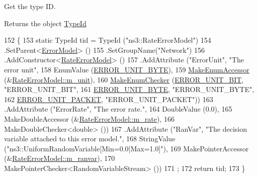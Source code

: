 Get the type ID. 

\begin{DoxyReturn}{Returns}
the object \hyperlink{classns3_1_1TypeId}{Type\+Id} 
\end{DoxyReturn}

\begin{DoxyCode}
152 \{ 
153   \textcolor{keyword}{static} TypeId tid = TypeId (\textcolor{stringliteral}{"ns3::RateErrorModel"})
154     .SetParent<\hyperlink{classns3_1_1ErrorModel_a89d58fc926bb907d546844d8e6437f30}{ErrorModel}> ()
155     .SetGroupName(\textcolor{stringliteral}{"Network"})
156     .AddConstructor<\hyperlink{classns3_1_1RateErrorModel_ac2f48cadd5c294ce6e41ce7d1fc2ae95}{RateErrorModel}> ()
157     .AddAttribute (\textcolor{stringliteral}{"ErrorUnit"}, \textcolor{stringliteral}{"The error unit"},
158                    EnumValue (\hyperlink{classns3_1_1RateErrorModel_a4da336ba2dfcb55e0b7d7a3e7e713c02a1ca371d9e108b4891a0fc4f567508db3}{ERROR\_UNIT\_BYTE}),
159                    \hyperlink{namespacens3_af5050739867ce63896dec011e332c8ec}{MakeEnumAccessor} (&\hyperlink{classns3_1_1RateErrorModel_a75b25e124364618bf15d66d0634c9cd4}{RateErrorModel::m\_unit}),
160                    \hyperlink{namespacens3_a48832781a2b521d3d0091e05ece30615}{MakeEnumChecker} (\hyperlink{classns3_1_1RateErrorModel_a4da336ba2dfcb55e0b7d7a3e7e713c02a21e90acaf501051edf3a2465a1486e9a}{ERROR\_UNIT\_BIT}, \textcolor{stringliteral}{"ERROR\_UNIT\_BIT"},
161                                     \hyperlink{classns3_1_1RateErrorModel_a4da336ba2dfcb55e0b7d7a3e7e713c02a1ca371d9e108b4891a0fc4f567508db3}{ERROR\_UNIT\_BYTE}, \textcolor{stringliteral}{"ERROR\_UNIT\_BYTE"},
162                                     \hyperlink{classns3_1_1RateErrorModel_a4da336ba2dfcb55e0b7d7a3e7e713c02aca366c7aebdc8be8b2ea287a7d3643a3}{ERROR\_UNIT\_PACKET}, \textcolor{stringliteral}{"ERROR\_UNIT\_PACKET"}))
163     .AddAttribute (\textcolor{stringliteral}{"ErrorRate"}, \textcolor{stringliteral}{"The error rate."},
164                    DoubleValue (0.0),
165                    MakeDoubleAccessor (&\hyperlink{classns3_1_1RateErrorModel_a024517a97a3487e851dbdfffb291cbd2}{RateErrorModel::m\_rate}),
166                    MakeDoubleChecker<double> ())
167     .AddAttribute (\textcolor{stringliteral}{"RanVar"}, \textcolor{stringliteral}{"The decision variable attached to this error model."},
168                    StringValue (\textcolor{stringliteral}{"ns3::UniformRandomVariable[Min=0.0|Max=1.0]"}),
169                    MakePointerAccessor (&\hyperlink{classns3_1_1RateErrorModel_ab1b5b03b825edbd1d566213501aacca6}{RateErrorModel::m\_ranvar}),
170                    MakePointerChecker<RandomVariableStream> ())
171   ;
172   \textcolor{keywordflow}{return} tid;
173 \}
\end{DoxyCode}


